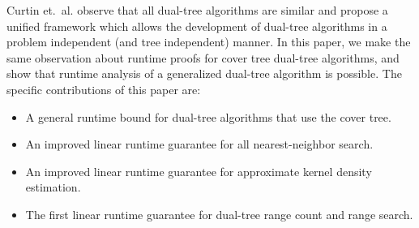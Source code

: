 \documentclass{article} %
\begin{document}
%
%
%
%
Curtin et.~al. \cite{curtin2013tree} observe that all dual-tree
algorithms are similar and propose a unified framework which allows the
development of dual-tree algorithms in a problem independent (and tree
independent) manner. In this paper, we make the same observation about runtime
proofs for cover tree dual-tree algorithms, and show that runtime analysis
of a generalized dual-tree algorithm is possible. The specific contributions of
this paper are:
\begin{itemize}
  \item A general runtime bound for dual-tree algorithms that use the cover
tree.
  \item An improved linear runtime guarantee for all nearest-neighbor search.
  \item An improved linear runtime guarantee for approximate kernel density
estimation.
  \item The first linear runtime guarantee for dual-tree range count and range
search.
\end{itemize}

\end{document}
